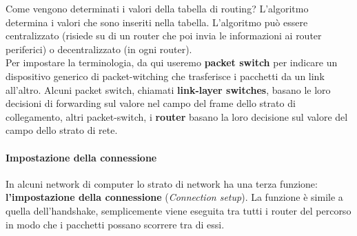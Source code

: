 \documentclass[11pt,a4paper]{book}
\begin{document}
Come vengono determinati i valori della tabella di routing? L'algoritmo determina i valori che sono inseriti nella tabella. L'algoritmo può essere centralizzato (risiede su di un router che poi invia le informazioni ai router periferici) o decentralizzato (in ogni router). \\
Per impostare la terminologia, da qui useremo \textbf{packet switch} per indicare un dispositivo generico di packet-witching che trasferisce i pacchetti da un link all'altro. Alcuni packet switch, chiamati \textbf{link-layer switches}, basano le loro decisioni di forwarding sul valore nel campo del frame dello strato di collegamento, altri packet-switch, i \textbf{router} basano la loro decisione sul valore del campo dello strato di rete.
\paragraph{Impostazione della connessione}
In alcuni network di computer lo strato di network ha una terza funzione: \textbf{l'impostazione della connessione} (\textit{Connection setup}). La funzione è simile a quella dell'handshake, semplicemente viene eseguita tra tutti i router del percorso in modo che i pacchetti possano scorrere tra di essi.
\end{document}
